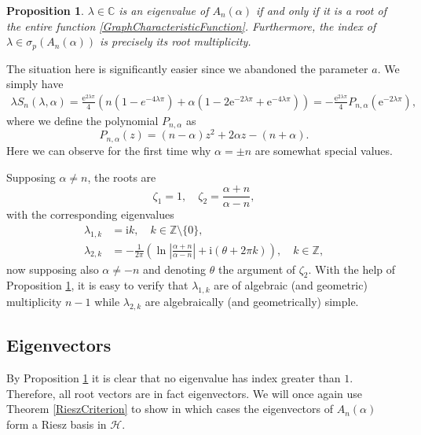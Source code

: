 \documentclass[11pt, a4paper,reqno]{amsart}
\theoremstyle{plain}
\newtheorem{proposition}[theorem]{Proposition}
\theoremstyle{definition}
\theoremstyle{remark}
\newcommand{\1}{\mathds 1}
\begin{document}
\begin{proposition}\label{GraphSProposition}
    $\lambda \in \mathbb C$ is an eigenvalue of $A_n(\alpha)$  if and only if it is a root of the entire function \eqref{GraphCharacteristicFunction}. Furthermore, the index of $\lambda \in \sigma_p(A_n(\alpha))$ is precisely its root multiplicity.
\end{proposition}

The situation here is significantly easier since we abandoned the parameter $a$. We simply have
\begin{align}
    \lambda S_n(\lambda, \alpha) = \frac{\mathrm{e}^{2\lambda\pi}}{4}\left(n(1-e^{-4\lambda\pi}) + \alpha(1-2\mathrm{e}^{-2\lambda\pi} + \mathrm{e}^{-4\lambda\pi})\right) = -\frac{\mathrm{e}^{2 \lambda\pi}}{4}P_{n,\alpha}\left(\mathrm{e}^{-2\lambda\pi}\right),
\end{align}
where we define the polynomial $P_{n,\alpha}$ as
\begin{equation} \label{GraphPolynomial}
    P_{n,\alpha}(z) = (n-\alpha)z^2 + 2\alpha z -(n + \alpha).
\end{equation}
Here we can observe for the first time why $\alpha = \pm n$ are somewhat special values.

Supposing $\alpha \neq n$, the roots are
\[
\zeta_1 = 1,\quad \zeta_2 = \frac{\alpha + n}{\alpha - n},
\] with the corresponding eigenvalues
\begin{align}
    \lambda_{1,k} &= \mathrm{i}k, \quad k \in \mathbb Z \setminus\{0\}, \nonumber \\
    \lambda_{2, k} &= -\frac{1}{2\pi}\left(\ln\left|\frac{\alpha +n}{\alpha-n}\right| + \mathrm{i}(\theta + 2\pi k)\right), \quad k \in \mathbb Z,
    \label{GraphEigenvalues}
\end{align}
now supposing also $\alpha \neq -n$ and denoting $\theta$ the argument of $\zeta_2$. With the help of Proposition \ref{GraphSProposition}, it is easy to verify that $\lambda_{1,k}$ are of algebraic (and geometric) multiplicity $n-1$ while $\lambda_{2,k}$ are algebraically (and geometrically) simple.

\subsection{Eigenvectors}
By Proposition \ref{GraphSProposition} it is clear that no eigenvalue has index greater than $1$. Therefore, all root vectors are in fact eigenvectors. We will once again use Theorem \ref{RieszCriterion} to show in which cases the eigenvectors of $A_n(\alpha)$ form a Riesz basis in $\mathcal H$. 
\end{document}
